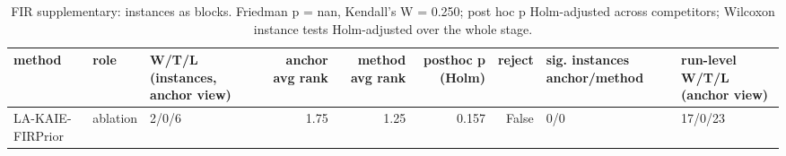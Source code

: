 \begin{table}[t]
\centering
\scriptsize
\caption{FIR supplementary: instances as blocks. Friedman p = nan, Kendall's W = 0.250; post hoc p Holm-adjusted across competitors; Wilcoxon instance tests Holm-adjusted over the whole stage.}
\label{tab:fir_supplementary_global}
\begin{tabular}{lllrrrrll}
\toprule
method & role & W/T/L (instances, anchor view) & anchor avg rank & method avg rank & posthoc p (Holm) & reject & sig. instances anchor/method & run-level W/T/L (anchor view) \\
\midrule
LA-KAIE-FIRPrior & ablation & 2/0/6 & 1.75 & 1.25 & 0.157 & False & 0/0 & 17/0/23 \\
\bottomrule
\end{tabular}
\end{table}
